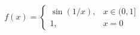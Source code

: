 \documentclass[preview]{standalone}
\begin{document}
\begin{align*}
f(x) = \begin{cases} \sin(1/x), & x \in (0, 1] \\ 1, & x = 0 \end{cases}
\end{align*}
\end{document}
